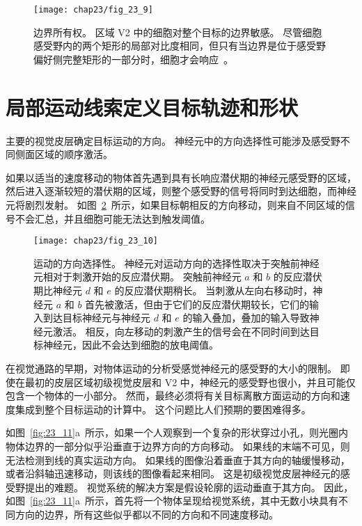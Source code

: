 \begin{figure}[htbp]
	\centering
	\texttt{[image: chap23/fig\_23\_9]}
	\caption{边界所有权。
		区域 V2 中的细胞对整个目标的边界敏感。
		尽管细胞感受野内的两个矩形的局部对比度相同，但只有当边界是位于感受野偏好侧完整矩形的一部分时，细胞才会响应~\cite{zhou2000coding}。}
	\label{fig:23_9}
\end{figure}



\section{局部运动线索定义目标轨迹和形状}

主要的视觉皮层确定目标运动的方向。
神经元中的方向选择性可能涉及感受野不同侧面区域的顺序激活。


如果以适当的速度移动的物体首先遇到具有长响应潜伏期的神经元感受野的区域，然后进入逐渐较短的潜伏期的区域，则整个感受野的信号将同时到达细胞，而神经元将剧烈发射。
如图~\ref{fig:23_10}~所示，如果目标朝相反的方向移动，则来自不同区域的信号不会汇总，并且细胞可能无法达到触发阈值。


\begin{figure}[htbp]
	\centering
	\texttt{[image: chap23/fig\_23\_10]}
	\caption{运动的方向选择性。
		神经元对运动方向的选择性取决于突触前神经元相对于刺激开始的反应潜伏期。
		突触前神经元 $a$ 和 $b$ 的反应潜伏期比神经元 $d$ 和 $e$ 的反应潜伏期稍长。
		当刺激从左向右移动时，神经元 $a$ 和 $b$ 首先被激活，但由于它们的反应潜伏期较长，它们的输入到达目标神经元与神经元 $d$ 和 $e$ 的输入叠加，叠加的输入导致神经元激活。
		相反，向左移动的刺激产生的信号会在不同时间到达目标神经元，因此不会达到细胞的放电阈值\cite{priebe2008inhibition}。}
	\label{fig:23_10}
\end{figure}


在视觉通路的早期，对物体运动的分析受感觉神经元的感受野的大小的限制。 
即使在最初的皮层区域初级视觉皮层和 V2 中，神经元的感受野也很小，并且可能仅包含一个物体的一小部分。 
然而，最终必须将有关目标离散方面运动的方向和速度集成到整个目标运动的计算中。 
这个问题比人们预期的要困难得多。


如图~\ref{fig:23_11}a~所示，如果一个人观察到一个复杂的形状穿过小孔，则光圈内物体边界的一部分似乎沿垂直于边界方向的方向移动。
如果线的末端不可见，则无法检测到线的真实运动方向。 
如果线的图像沿着垂直于其方向的轴缓慢移动，或者沿斜轴迅速移动，则该线的图像看起来相同。
这是初级视觉皮层神经元的感受野提出的难题。 
视觉系统的解决方案是假设轮廓的运动垂直于其方向。 
因此，如图~\ref{fig:23_11}a~所示，首先将一个物体呈现给视觉系统，其中无数小块具有不同方向的边界，所有这些似乎都以不同的方向和不同速度移动。


